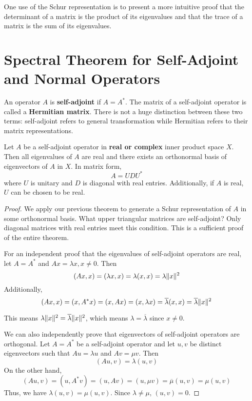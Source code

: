 One use of the Schur representation is to present a more intuitive proof that the determinant of a matrix is the product of its eigenvalues and that the trace of a matrix is the sum of its eigenvalues. 


\section{Spectral Theorem for Self-Adjoint and Normal Operators}

\begin{definition}
An operator $A$ is \textbf{self-adjoint} if $A = A^{*}$. The matrix of a self-adjoint operator is called a \textbf{Hermitian matrix}. There is not a huge distinction between these two terms: self-adjoint refers to general transformation while Hermitian refers to their matrix representations.
\end{definition}

\begin{theorem}
Let $A$ be a self-adjoint operator in \textbf{real or complex} inner product space $X$. Then all eigenvalues of $A$ are real and there exists an orthonormal basis of eigenvectors of $A$ in $X$. In matrix form, 
$$A = UDU^{*}$$
where $U$ is unitary and $D$ is diagonal with real entries. Additionally, if $A$ is real, $U$ can be chosen to be real. 
\end{theorem}

\begin{proof}
We apply our previous theorem to generate a Schur representation of $A$ in some orthonormal basis. What upper triangular matrices are self-adjoint? Only diagonal matrices with real entries meet this condition. This is a sufficient proof of the entire theorem. 

For an independent proof that the eigenvalues of self-adjoint operators are real, let $A = A^{*}$ and $Ax = \lambda x, x \neq 0$. Then 
$$(Ax, x) = (\lambda x, x) = \lambda (x, x) = \lambda \lVert x\rVert^{2}$$
Additionally, 
$$(Ax, x) = (x, A^{*}x) = (x, Ax) = (x, \lambda x) = \overline{\lambda} (x, x) = \overline{\lambda} \lVert x\rVert^{2}$$

This means $\lambda \lVert x\rVert^{2} = \overline{\lambda} \lVert x\rVert^{2}$, which means $\lambda = \overline{\lambda}$ since $x \neq 0$. 

We can also independently prove that eigenvectors of self-adjoint operators are orthogonal. Let $A = A^{*}$ be a self-adjoint operator and let $u, v$ be distinct eigenvectors such that $Au = \lambda u$ and $Av = \mu v$. Then 
$$(Au, v) = \lambda (u, v)$$ 
On the other hand, 
$$(Au, v) = (u, A^{*} v) = (u, Av) = (u, \mu v) = \overline{\mu} (u, v) = \mu (u, v)$$
Thus, we have $\lambda (u, v) = \mu (u, v)$. Since $\lambda \neq \mu$, $(u, v) = 0$. 
\end{proof}

